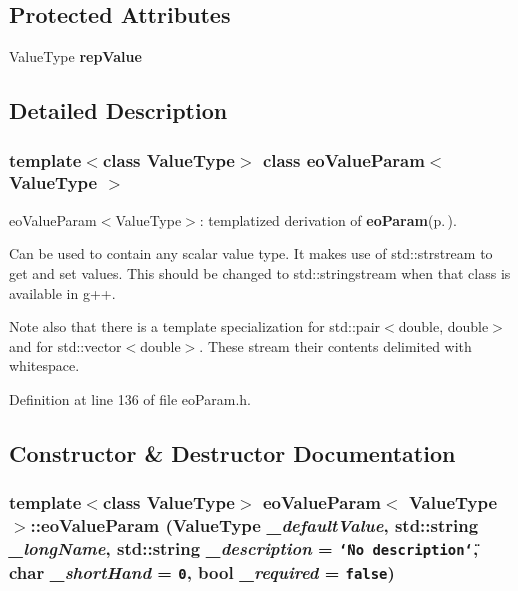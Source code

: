 \subsection*{Protected Attributes}
\begin{CompactItemize}
\item 
Value\-Type {\bf rep\-Value}\label{classeo_value_param_p0}

\end{CompactItemize}


\subsection{Detailed Description}
\subsubsection*{template$<$class Value\-Type$>$ class eo\-Value\-Param$<$ Value\-Type $>$}

eo\-Value\-Param$<$Value\-Type$>$: templatized derivation of {\bf eo\-Param}{\rm (p.\,\pageref{classeo_param})}. 

Can be used to contain any scalar value type. It makes use of std::strstream to get and set values. This should be changed to std::stringstream when that class is available in g++.

Note also that there is a template specialization for std::pair$<$double, double$>$ and for std::vector$<$double$>$. These stream their contents delimited with whitespace. 



Definition at line 136 of file eo\-Param.h.

\subsection{Constructor \& Destructor Documentation}
\subsubsection{\setlength{\rightskip}{0pt plus 5cm}template$<$class Value\-Type$>$ {\bf eo\-Value\-Param}$<$ Value\-Type $>$::{\bf eo\-Value\-Param} (Value\-Type {\em \_\-default\-Value}, std::string {\em \_\-long\-Name}, std::string {\em \_\-description} = {\tt \char`\"{}No\ description\char`\"{}}, char {\em \_\-short\-Hand} = {\tt 0}, bool {\em \_\-required} = {\tt false})\hspace{0.3cm}{\tt  [inline]}}\label{classeo_value_param_a1}


